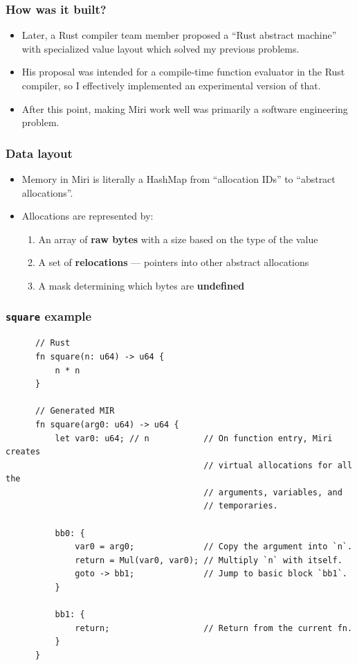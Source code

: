 \documentclass{beamer}
\begin{document}
\begin{frame}
  \frametitle{How was it built?}
  \begin{itemize}
    \item Later, a Rust compiler team member proposed a ``Rust abstract
      machine'' with specialized value layout which solved my previous problems.
      \pause

    \item His proposal was intended for a compile-time function evaluator in the
      Rust compiler, so I effectively implemented an experimental version of
      that. \pause

    \item After this point, making Miri work well was primarily a software
      engineering problem.
  \end{itemize}
\end{frame}

\begin{frame}
  \frametitle{Data layout}
  \begin{itemize}
    \item Memory in Miri is literally a HashMap from ``allocation IDs'' to
      ``abstract allocations''.

    \item Allocations are represented by: \pause
      \begin{enumerate}
        \item An array of \textbf{raw bytes} with a size based on the type of
          the value \pause
        \item A set of \textbf{relocations} --- pointers into other abstract
          allocations \pause
        \item A mask determining which bytes are \textbf{undefined}
      \end{enumerate}
  \end{itemize}
\end{frame}

\begin{frame}[fragile]
  \frametitle{\texttt{square} example}
  \begin{center}
    \begin{verbatim}
      // Rust
      fn square(n: u64) -> u64 {
          n * n
      }

      // Generated MIR
      fn square(arg0: u64) -> u64 {
          let var0: u64; // n           // On function entry, Miri creates
                                        // virtual allocations for all the
                                        // arguments, variables, and
                                        // temporaries.

          bb0: {
              var0 = arg0;              // Copy the argument into `n`.
              return = Mul(var0, var0); // Multiply `n` with itself.
              goto -> bb1;              // Jump to basic block `bb1`.
          }

          bb1: {
              return;                   // Return from the current fn.
          }
      }
    \end{verbatim}
  \end{center}
\end{frame}
\end{document}
